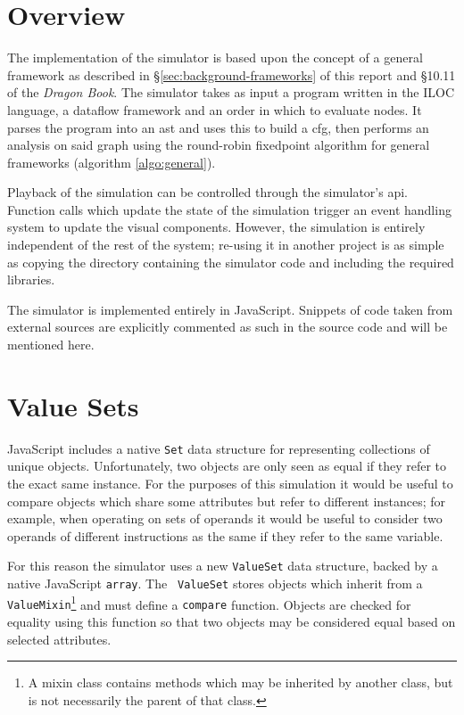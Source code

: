 \documentclass[bsc,twoside,singlespacing,parskip,logo,notimes,normalheadings]{infthesis}
\begin{document}
    \section{Overview}
    The implementation of the simulator is based upon the concept of a
    general framework as described in
    \S\ref{sec:background-frameworks} of this report and \S10.11 of
    the {\em Dragon Book}\cite{dragonbook}. The simulator takes as
    input a program written in the ILOC language, a \gls{dataflow}
    framework and an order in which to evaluate nodes. It parses the
    program into an \gls{ast} and uses this to build a \gls{cfg}, then
    performs an analysis on said graph using the round-robin
    \gls{fixedpoint} algorithm for general frameworks (algorithm
    \ref{algo:general}).

    Playback of the simulation can be controlled through the
    simulator's \gls{api}. Function calls which update the state of
    the simulation trigger an event handling system to update the
    visual components. However, the simulation is entirely independent
    of the rest of the system; re-using it in another project is as
    simple as copying the directory containing the simulator code and
    including the required libraries.

    The simulator is implemented entirely in JavaScript. Snippets of
    code taken from external sources are explicitly commented as such
    in the source code and will be mentioned here.

    \section{Value Sets}

    JavaScript includes a native {\tt Set} data structure for
    representing collections of unique objects. Unfortunately, two
    objects are only seen as equal if they refer to the exact same
    instance. For the purposes of this simulation it would be useful
    to compare objects which share some attributes but refer to
    different instances; for example, when operating on sets of
    operands it would be useful to consider two operands of different
    instructions as the same if they refer to the same variable.

    For this reason the simulator uses a new {\tt ValueSet} data
    structure, backed by a native JavaScript {\tt array}. The {\tt
      ValueSet} stores objects which inherit from a {\tt
      ValueMixin}\footnote{A mixin class contains methods which may be
      inherited by another class, but is not necessarily the parent of
      that class.} and must define a {\tt compare} function. Objects
    are checked for equality using this function so that two objects
    may be considered equal based on selected attributes.
\end{document}
